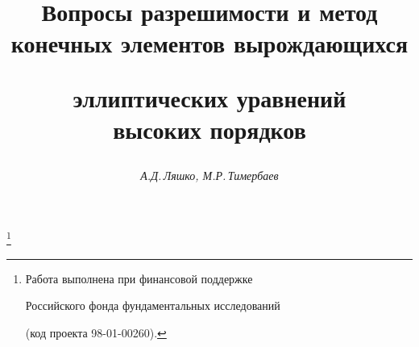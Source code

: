 




% 





\newcommand{\loc}{\operatorname{loc}}


\newcommand{\diam}{\operatorname{diam}}


\newcommand{\tts}[1]{}







 


\setcounter{page}{57}















\author{\it А.Д.\,Ляшко, М.Р.\,Тимербаев}




\title{Вопросы разрешимости и метод конечных элементов вырождающихся


эллиптических уравнений\\ высоких порядков}


\thanks{Работа выполнена при финансовой поддержке 


Российского фонда фундаментальных исследований 


(код проекта 98-01-00260).}





\date{}




\pagestyle{plain} %





